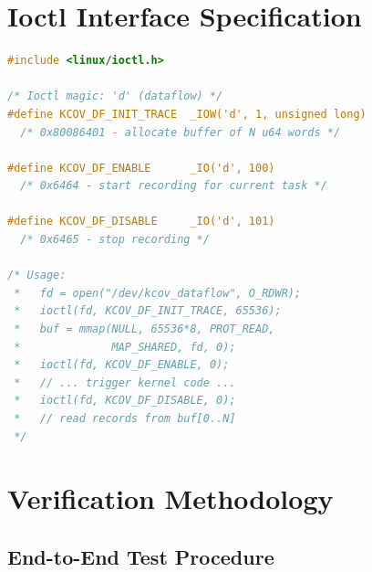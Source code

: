 \documentclass{ndss}
\begin{document}
\section{Ioctl Interface Specification}\label{app:ioctl}

\begin{lstlisting}[language=C,caption={Complete ioctl definitions.}]
#include <linux/ioctl.h>

/* Ioctl magic: 'd' (dataflow) */
#define KCOV_DF_INIT_TRACE  _IOW('d', 1, unsigned long)
  /* 0x80086401 - allocate buffer of N u64 words */

#define KCOV_DF_ENABLE      _IO('d', 100)
  /* 0x6464 - start recording for current task */

#define KCOV_DF_DISABLE     _IO('d', 101)
  /* 0x6465 - stop recording */

/* Usage:
 *   fd = open("/dev/kcov_dataflow", O_RDWR);
 *   ioctl(fd, KCOV_DF_INIT_TRACE, 65536);
 *   buf = mmap(NULL, 65536*8, PROT_READ,
 *              MAP_SHARED, fd, 0);
 *   ioctl(fd, KCOV_DF_ENABLE, 0);
 *   // ... trigger kernel code ...
 *   ioctl(fd, KCOV_DF_DISABLE, 0);
 *   // read records from buf[0..N]
 */
\end{lstlisting}

\section{Verification Methodology}\label{app:verify}

\subsection{End-to-End Test Procedure}
\end{document}

